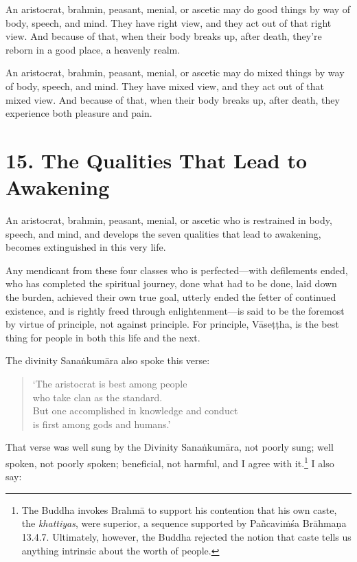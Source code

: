 \documentclass[12pt,openany]{book}%
\begin{document}
An aristocrat, brahmin, peasant, menial, or ascetic may do good things by way of body, speech, and mind. They have right view, and they act out of that right view. And because of that, when their body breaks up, after death, they’re reborn in a good place, a heavenly realm. 

An aristocrat, brahmin, peasant, menial, or ascetic may do mixed things by way of body, speech, and mind. They have mixed view, and they act out of that mixed view. And because of that, when their body breaks up, after death, they experience both pleasure and pain. 

\section*{15. The Qualities That Lead to Awakening }

An aristocrat, brahmin, peasant, menial, or ascetic who is restrained in body, speech, and mind, and develops the seven qualities that lead to awakening, becomes extinguished in this very life. 

Any mendicant from these four classes who is perfected—with defilements ended, who has completed the spiritual journey, done what had to be done, laid down the burden, achieved their own true goal, utterly ended the fetter of continued existence, and is rightly freed through enlightenment—is said to be the foremost by virtue of principle, not against principle. For principle, \textsanskrit{Vāseṭṭha}, is the best thing for people in both this life and the next. 

The divinity \textsanskrit{Sanaṅkumāra} also spoke this verse: 

\begin{verse}%
‘The aristocrat is best among people \\
who take clan as the standard. \\
But one accomplished in knowledge and conduct \\
is first among gods and humans.’ 

%
\end{verse}

That verse was well sung by the Divinity \textsanskrit{Sanaṅkumāra}, not poorly sung; well spoken, not poorly spoken; beneficial, not harmful, and I agree with it.\footnote{The Buddha invokes \textsanskrit{Brahmā} to support his contention that his own caste, the \textit{khattiyas}, were superior, a sequence supported by \textsanskrit{Pañcaviṁśa} \textsanskrit{Brāhmaṇa} 13.4.7. Ultimately, however, the Buddha rejected the notion that caste tells us anything intrinsic about the worth of people. } I also say: 
\end{document}
